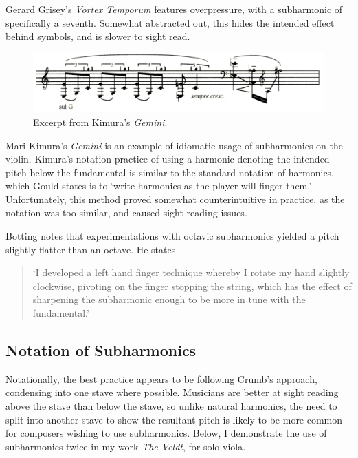 Gerard Grisey's \emph{Vortex Temporum} features overpressure, with a subharmonic of specifically a seventh. 
Somewhat abstracted out, this hides the intended effect behind symbols, and is slower to sight read.

\begin{figure}
    \includegraphics[width=\linewidth]{./resources/kimura_gemini.png}
    \caption{Excerpt from Kimura's \emph{Gemini}.}
\label{fig:Excerpt from Kimura's Gemini}
  \end{figure}

  Mari Kimura's \emph{Gemini} is an example of idiomatic usage of subharmonics on the violin. 
  Kimura's notation practice of using a harmonic denoting the intended pitch below the fundamental is similar to the standard notation of harmonics, which Gould states is to `write harmonics as the player will finger them.'\autocite[413]{gouldBars2011} 
  Unfortunately, this method proved somewhat counterintuitive in practice, as the notation was too similar, and caused sight reading issues.

  Botting notes that experimentations with octavic subharmonics yielded a pitch slightly flatter than an octave. He states \begin{quotation}
    `I developed a left hand finger technique whereby I rotate my hand slightly clockwise, pivoting on the finger stopping the string, which has the effect of sharpening the subharmonic enough to be more in tune with the fundamental.'\autocite[111]{bottingDevelopingPersonalVocabulary2019}
\end{quotation}

\subsection{Notation of Subharmonics}
Notationally, the best practice appears to be following Crumb's approach, condensing into one stave where possible. 
Musicians are better at sight reading above the stave than below the stave, so unlike natural harmonics, the need to split into another stave to show the resultant pitch is likely to be more common for composers wishing to use subharmonics. 
Below, I demonstrate the use of subharmonics twice in my work \emph{The Veldt}, for solo viola.



